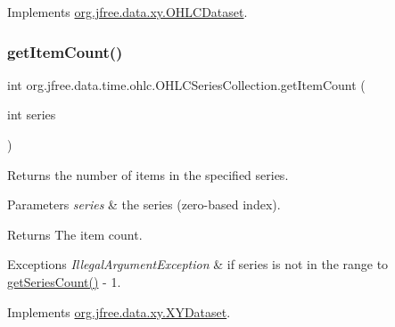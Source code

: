 Implements \mbox{\hyperlink{interfaceorg_1_1jfree_1_1data_1_1xy_1_1_o_h_l_c_dataset_acd02ab8db72bebf0234954bd962365cb}{org.\+jfree.\+data.\+xy.\+O\+H\+L\+C\+Dataset}}.

\mbox{\label{classorg_1_1jfree_1_1data_1_1time_1_1ohlc_1_1_o_h_l_c_series_collection_a2bff752977bb7e121b5ff080114165d3}} 
\subsubsection{\texorpdfstring{get\+Item\+Count()}{getItemCount()}}
{\footnotesize\ttfamily int org.\+jfree.\+data.\+time.\+ohlc.\+O\+H\+L\+C\+Series\+Collection.\+get\+Item\+Count (\begin{DoxyParamCaption}\item[{int}]{series }\end{DoxyParamCaption})}

Returns the number of items in the specified series.


\begin{DoxyParams}{Parameters}
{\em series} & the series (zero-\/based index).\\
\hline
\end{DoxyParams}
\begin{DoxyReturn}{Returns}
The item count.
\end{DoxyReturn}

\begin{DoxyExceptions}{Exceptions}
{\em Illegal\+Argument\+Exception} & if {\ttfamily series} is not in the range {} to {\ttfamily \mbox{\hyperlink{classorg_1_1jfree_1_1data_1_1time_1_1ohlc_1_1_o_h_l_c_series_collection_aa6b3cf5922a008e3c39d01282a008a6e}{get\+Series\+Count()}} -\/ 1}. \\
\hline
\end{DoxyExceptions}


Implements \mbox{\hyperlink{interfaceorg_1_1jfree_1_1data_1_1xy_1_1_x_y_dataset_ae81f9de91dfcae45028fc8a486a119da}{org.\+jfree.\+data.\+xy.\+X\+Y\+Dataset}}.

\mbox{\label{classorg_1_1jfree_1_1data_1_1time_1_1ohlc_1_1_o_h_l_c_series_collection_a94216d1171b19bc6b3268f570a2c9457}} 
